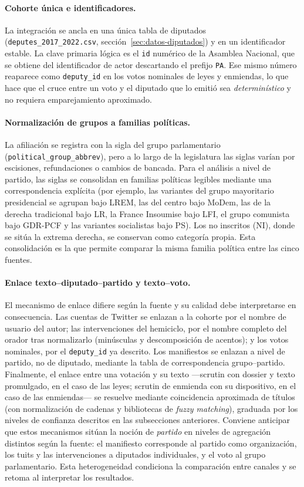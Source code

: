 \paragraph{Cohorte única e identificadores.}
La integración se ancla en una única tabla de diputados
(\texttt{deputes\_2017\_2022.csv}, sección~\ref{sec:datos-diputados}) y en un
identificador estable. La clave primaria lógica es el \texttt{id} numérico de la
Asamblea Nacional, que se obtiene del identificador de actor descartando el
prefijo \texttt{PA}. Ese mismo número reaparece como \texttt{deputy\_id} en los
votos nominales de leyes y enmiendas, lo que hace que el cruce entre un voto y el
diputado que lo emitió sea \emph{determinístico} y no requiera emparejamiento
aproximado.

\paragraph{Normalización de grupos a familias políticas.}
La afiliación se registra con la sigla del grupo parlamentario
(\texttt{political\_group\_abbrev}), pero a lo largo de la legislatura las siglas
varían por escisiones, refundaciones o cambios de bancada. Para el análisis a
nivel de partido, las siglas se consolidan en familias políticas legibles
mediante una correspondencia explícita (por ejemplo, las variantes del grupo
mayoritario presidencial se agrupan bajo LREM, las del centro bajo MoDem, las de
la derecha tradicional bajo LR, la France Insoumise bajo LFI, el grupo comunista
bajo GDR-PCF y las variantes socialistas bajo PS). Los no inscritos (NI), donde
se sitúa la extrema derecha, se conservan como categoría propia. Esta
consolidación es la que permite comparar la misma familia política entre las
cinco fuentes.

\paragraph{Enlace texto--diputado--partido y texto--voto.}
El mecanismo de enlace difiere según la fuente y su calidad debe interpretarse en
consecuencia. Las cuentas de Twitter se enlazan a la cohorte por el nombre de
usuario del autor; las intervenciones del hemiciclo, por el nombre completo del
orador tras normalizarlo (minúsculas y descomposición de acentos); y los votos
nominales, por el \texttt{deputy\_id} ya descrito. Los manifiestos se enlazan a
nivel de partido, no de diputado, mediante la tabla de correspondencia
grupo--partido. Finalmente, el enlace entre una votación y su texto ---scrutin
con dossier y texto promulgado, en el caso de las leyes; scrutin de enmienda con
su dispositivo, en el caso de las enmiendas--- se resuelve mediante coincidencia
aproximada de títulos (con normalización de cadenas y bibliotecas de
\emph{fuzzy matching}), graduada por los niveles de confianza descritos en las
subsecciones anteriores. Conviene anticipar que estos mecanismos sitúan la
noción de \emph{partido} en niveles de agregación distintos según la fuente: el
manifiesto corresponde al partido como organización, los tuits y las
intervenciones a diputados individuales, y el voto al grupo parlamentario. Esta
heterogeneidad condiciona la comparación entre canales y se retoma al
interpretar los resultados.

